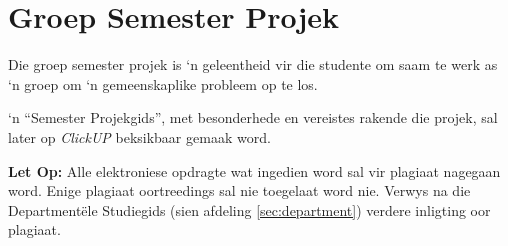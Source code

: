 \section{Groep Semester Projek}
    Die groep semester projek is `n geleentheid vir die studente om saam te
    werk as `n groep om `n gemeenskaplike probleem op te los.

    `n ``Semester Projekgids'', met besonderhede en vereistes rakende die
    projek, sal later op \textit{ClickUP} beksikbaar gemaak word.

    \textbf{Let Op:} Alle elektroniese opdragte wat ingedien word sal vir
    plagiaat nagegaan word. Enige plagiaat oortreedings sal nie toegelaat word
    nie.  Verwys na die Department\"ele Studiegids (sien afdeling
    \ref{sec:department}) verdere inligting oor plagiaat.
